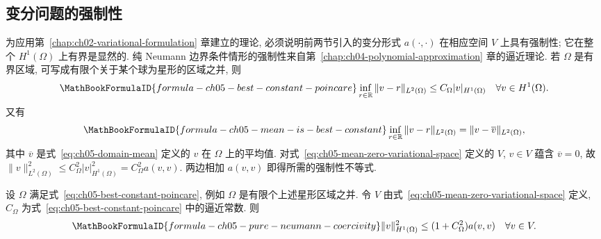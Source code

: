 \subsection{变分问题的强制性}
\label{sec:ch05-variational-coercivity}
\setcounter{thmcount}{0}
\setcounter{equation}{0}

为应用第~\ref{chap:ch02-variational-formulation} 章建立的理论, 必须说明前两节引入的变分形式 $a(\cdot,\cdot)$ 在相应空间 $V$ 上具有强制性; 它在整个 $H^1(\Omega)$ 上有界是显然的. 纯 Neumann 边界条件情形的强制性来自第~\ref{chap:ch04-polynomial-approximation} 章的逼近理论. 若 $\Omega$ 是有界区域, 可写成有限个关于某个球为星形的区域之并, 则
\begin{equation}
\MathBookFormulaID{formula-ch05-best-constant-poincare}
\label{eq:ch05-best-constant-poincare}
\inf_{r\in\mathbb R}\|v-r\|_{L^2(\Omega)}
\leq C_\Omega|v|_{H^1(\Omega)}
\quad\forall v\in H^1(\Omega).
\end{equation}
又有
\[
\MathBookFormulaID{formula-ch05-mean-is-best-constant}
\inf_{r\in\mathbb R}\|v-r\|_{L^2(\Omega)}
=\|v-\overline v\|_{L^2(\Omega)},
\]
其中 $\overline v$ 是式~\eqref{eq:ch05-domain-mean} 定义的 $v$ 在 $\Omega$ 上的平均值. 对式~\eqref{eq:ch05-mean-zero-variational-space} 定义的 $V$, $v\in V$ 蕴含 $\overline v=0$, 故 $\|v\|_{L^2(\Omega)}^2\leq C_\Omega^2|v|_{H^1(\Omega)}^2=C_\Omega^2a(v,v)$. 两边相加 $a(v,v)$ 即得所需的强制性不等式.

\begin{Proposition}
\label{prop:ch05-pure-neumann-coercivity}
设 $\Omega$ 满足式~\eqref{eq:ch05-best-constant-poincare}, 例如 $\Omega$ 是有限个上述星形区域之并. 令 $V$ 由式~\eqref{eq:ch05-mean-zero-variational-space} 定义, $C_\Omega$ 为式~\eqref{eq:ch05-best-constant-poincare} 中的逼近常数. 则
\[
\MathBookFormulaID{formula-ch05-pure-neumann-coercivity}
\|v\|_{H^1(\Omega)}^2\leq(1+C_\Omega^2)a(v,v)
\quad\forall v\in V.
\]
\end{Proposition}

